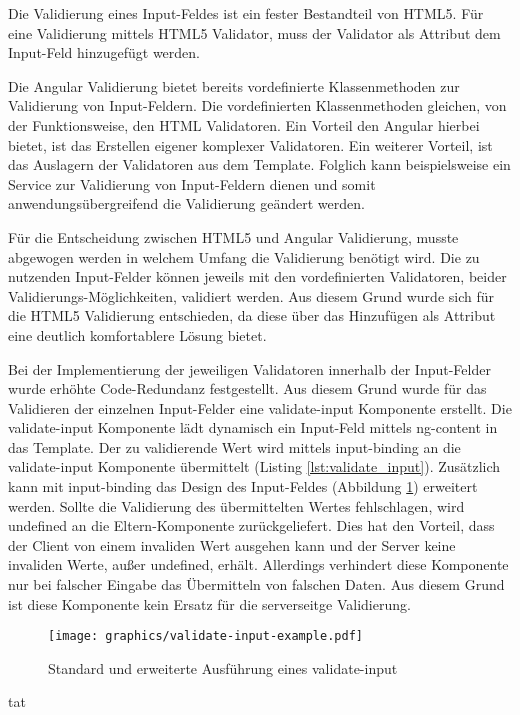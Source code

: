 \begin{description}
	Die Validierung eines Input-Feldes ist ein fester Bestandteil von \gls{HTML}5. Für eine Validierung mittels \gls{HTML}5 Validator, muss der Validator als Attribut dem Input-Feld hinzugefügt werden.

	Die Angular Validierung bietet bereits vordefinierte Klassenmethoden zur Validierung von Input-Feldern. Die vordefinierten Klassenmethoden gleichen, von der Funktionsweise, den HTML Validatoren. Ein Vorteil den Angular hierbei bietet, ist das Erstellen eigener komplexer Validatoren. Ein weiterer Vorteil, ist das Auslagern der Validatoren aus dem Template. Folglich kann beispielsweise ein Service zur Validierung von Input-Feldern dienen und somit anwendungsübergreifend die Validierung geändert werden.

	Für die Entscheidung zwischen \gls{HTML}5 und Angular Validierung, musste abgewogen werden in welchem Umfang die Validierung benötigt wird. Die zu nutzenden Input-Felder können jeweils mit den vordefinierten Validatoren, beider Validierungs-Möglichkeiten, validiert werden. Aus diesem Grund wurde sich für die \gls{HTML}5 Validierung entschieden, da diese über das Hinzufügen als Attribut eine deutlich komfortablere Lösung bietet.

		Bei der Implementierung der jeweiligen Validatoren innerhalb der Input-Felder wurde erhöhte Code-Redundanz festgestellt. Aus diesem Grund wurde für das Validieren der einzelnen Input-Felder eine validate-input Komponente erstellt. Die validate-input Komponente lädt dynamisch ein Input-Feld mittels ng-content in das Template. Der zu validierende Wert wird mittels input-binding an die validate-input Komponente übermittelt (Listing \ref{lst:validate_input}). Zusätzlich kann mit input-binding das Design des Input-Feldes (Abbildung \ref{fig:validate_input}) erweitert werden. Sollte die Validierung des übermittelten Wertes fehlschlagen, wird undefined an die Eltern-Komponente zurückgeliefert. Dies hat den Vorteil, dass der Client von einem invaliden Wert ausgehen kann und der Server keine invaliden Werte, au{\ss}er undefined, erhält. Allerdings verhindert diese Komponente nur bei falscher Eingabe das Übermitteln von falschen Daten. Aus diesem Grund ist diese Komponente kein Ersatz für die serverseitge Validierung.

	\begin{figure}
		\centering
		\texttt{[image: graphics/validate-input-example.pdf]}
		\caption{Standard und erweiterte Ausführung eines validate-input}
		\label{fig:validate_input}
	\end{figure}

	\begin{minipage}{\linewidth}
tat			
	\end{minipage}
\end{description}

